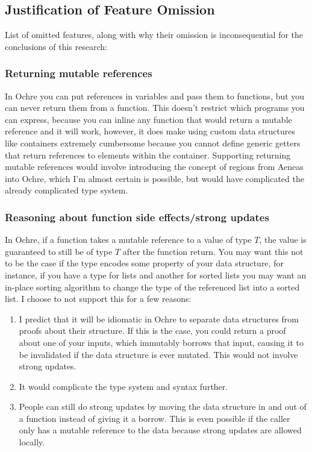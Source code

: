 \documentclass[12pt,twoside]{report}
\begin{document}
\subsection{Justification of Feature Omission}
List of omitted features, along with why their omission is inconsequential for the conclusions of this research:

\subsubsection{Returning mutable references}
In Ochre you can put references in variables and pass them to functions, but you can never return them from a function. This doesn't restrict which programs you can express, because you can inline any function that would return a mutable reference and it will work, however, it does make using custom data structures like containers extremely cumbersome because you cannot define generic getters that return references to elements within the container. Supporting returning mutable references would involve introducing the concept of regions from Aeneas into Ochre, which I'm almost certain is possible, but would have complicated the already complicated type system.

\subsubsection{Reasoning about function side effects/strong updates}
In Ochre, if a function takes a mutable reference to a value of type $T$, the value is guaranteed to still be of type $T$ after the function return. You may want this not to be the case if the type encodes some property of your data structure, for instance, if you have a type for lists and another for sorted lists you may want an in-place sorting algorithm to change the type of the referenced list into a sorted list. I choose to not support this for a few reasons:
\begin{enumerate}
  \item I predict that it will be idiomatic in Ochre to separate data structures from proofs about their structure. If this is the case, you could return a proof about one of your inputs, which immutably borrows that input, causing it to be invalidated if the data structure is ever mutated. This would not involve strong updates.
  \item It would complicate the type system and syntax further.
  \item People can still do strong updates by moving the data structure in and out of a function instead of giving it a borrow. This is even possible if the caller only has a mutable reference to the data because strong updates are allowed locally.
\end{enumerate}
\end{document}
